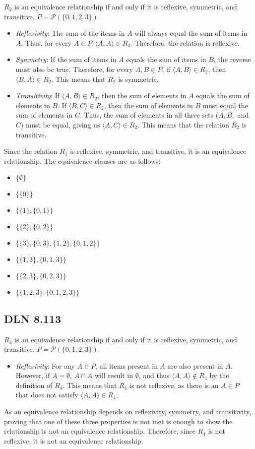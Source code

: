 \documentclass[titlepage]{article}
\begin{document}
$R_2$ is an equivalence relationship if and only if it is reflexive, symmetric, and transitive. $P = \mathcal{P}(\{0,1,2,3\})$. 
\begin{itemize}
\item \emph{Reflexivity}: The sum of the items in $A$ will always equal the sum of items in $A$. Thus, for every $A \in P, \langle A,A \rangle \in R_2$. Therefore, the relation is reflexive.
\item \emph{Symmetry}: If the sum of items in $A$ equals the sum of items in $B$, the reverse must also be true. Therefore, for every $A,B \in P$, if $\langle A,B \rangle \in R_2$, then $\langle B,A \rangle \in R_2$. This means that $R_2$ is symmetric. 
\item \emph{Transitivity}: If $\langle A,B \rangle \in R_2$, then the sum of elements in $A$ equals the sum of elements in $B$. If $\langle B,C \rangle \in R_2$, then the sum of elements in $B$ must equal the sum of elements in $C$. Thus, the sum of elements in all three sets ($A,B,$ and $C$) must be equal, giving us $\langle A,C \rangle \in R_2$. This means that the relation $R_2$ is transitive.
\end{itemize}
Since the relation $R_1$ is reflexive, symmetric, and transitive, it is an equivalence relationship. The equivalence clauses are as follows:
\begin{itemize}
\item $\{ \emptyset\} $
\item $\{ \{0\}\} $
\item $\{ \{1\}, \{0,1\}\} $
\item $\{ \{2\}, \{0,2\}\} $
\item $\{ \{3\}, \{0,3\}, \{1,2\}, \{0,1,2\}\} $
\item $\{ \{1,3\}, \{0,1,3\}\} $
\item $\{ \{2,3\}, \{0,2,3\}\} $
\item $\{ \{1,2,3\}, \{0,1,2,3\}\} $
\end{itemize}

\subsection{DLN 8.113} 

$R_4$ is an equivalence relationship if and only if it is reflexive, symmetric, and transitive. $P = \mathcal{P}(\{0,1,2,3\})$. 
\begin{itemize}
\item \emph{Reflexivity}: For any $A \in P$, all items present in $A$ are also present in $A$. However, if $A = \emptyset$, $A \cap A$ will result in $\emptyset$, and thus $\langle A,A\rangle \notin R_4$ by the definition of $R_4$. This means that $R_4$ is not reflexive, as there is an $A \in P$ that does not satisfy $\langle A,A\rangle \in R_4$.
\end{itemize}
As an equivalence relationship depends on reflexivity, symmetry, and transitivity, proving that one of these three properties is not met is enough to show the relationship is not an equivalence relationship. Therefore, since $R_4$ is not reflexive, it is not an equivalence relationship.
\end{document}
